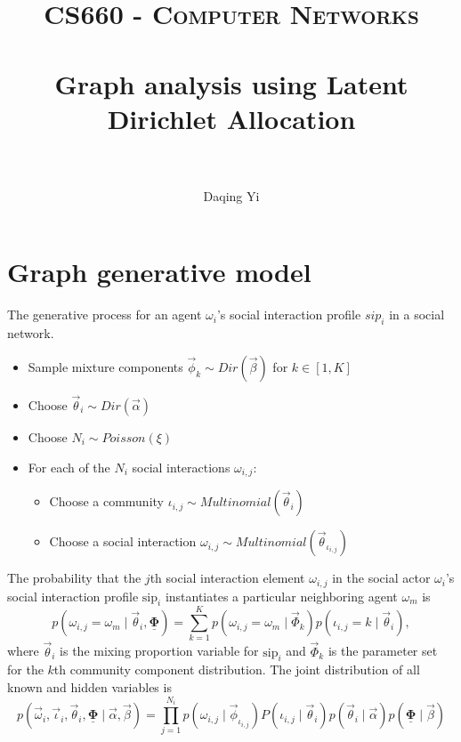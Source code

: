 \documentclass[paper=a4, fontsize=11pt]{scrartcl}
\title{
		\usefont{OT1}{bch}{b}{n}
		\normalfont \normalsize \textsc{CS660 - Computer Networks} \\ [25pt]
		\horrule{0.5pt} \\[0.4cm]
		\huge Graph analysis using Latent Dirichlet Allocation \\
		\horrule{2pt} \\[0.5cm]
}
\author{
		\normalfont %
        Daqing Yi \\
}
\begin{document}
\maketitle

\section{Graph generative model}

The generative process for an agent $ \omega_{i} $'s social interaction profile $ sip_{i} $ in a social network.
\begin{itemize}
\item Sample mixture components $ \vec{\phi}_{k} \sim Dir(\vec{\beta}) $ for $ k \in [1, K] $
\item Choose $ \vec{\theta}_{i} \sim Dir(\vec{\alpha}) $ 
\item Choose $ N_{i}  \sim Poisson(\xi) $
\item For each of the $ N_{i} $ social interactions $ \omega_{i,j} $:
	\begin{itemize}
		\item Choose a community $ \iota_{i,j} \sim Multinomial( \vec{\theta}_{i} ) $
		\item Choose a social interaction $ \omega_{i,j} \sim Multinomial( \vec{\theta}_{\iota_{i,j}} ) $	
	\end{itemize}
\end{itemize}

The probability that the $ j $th social interaction element $ \omega_{i,j} $ in the social actor $ \omega_{i} $'s social interaction profile $ \mbox{sip}_{i} $ instantiates a particular neighboring agent $ \omega_{m} $ is
\begin{equation}
p( \omega_{i,j} = \omega_{m} \mid \vec{\theta}_{i} , \underline{\mathbf{\Phi}} ) = \sum_{k=1}^{K} p( \omega_{i,j} = \omega_{m} \mid \vec{\Phi}_{k} ) p( \iota_{i,j} = k \mid \vec{\theta}_{i} ),
\end{equation}
where $ \vec{\theta}_{i} $ is the mixing proportion variable for $ \mbox{sip}_{i} $ and $ \vec{\Phi}_{k} $ is the parameter set for the $ k $th community component distribution.
The joint distribution of all known and hidden variables is
\begin{equation}
p( \vec{\omega}_{i} , \vec{\iota}_{i}, \vec{\theta}_{i} , \underline{\mathbf{\Phi}}  \mid \vec{\alpha} , \vec{\beta} ) = \prod_{j=1}^{N_{i}} 
p( \omega_{i,j} \mid \vec{\phi}_{\iota_{i,j}} ) P( \iota_{i,j} \mid \vec{\theta}_{i} )
p( \vec{\theta}_{i} \mid \vec{\alpha} ) p( \underline{\mathbf{\Phi}} \mid \vec{\beta} )
\end{equation}
\end{document}
